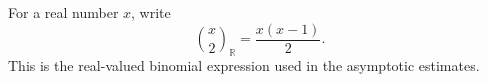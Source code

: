 \begin{definition}
For a real number \(x\), write
\[
\binom{x}{2}_{\mathbb R}=\frac{x(x-1)}2.
\]
This is the real-valued binomial expression used in the asymptotic estimates.
\end{definition}

